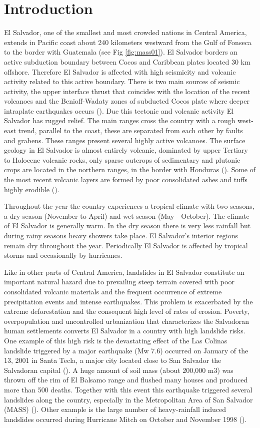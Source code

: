 \documentclass[11pt,twoside]{rmta2010esp}%
\begin{document}
\section{Introduction}
\label{sec:intr}
El Salvador, one of the smallest and most crowded nations in Central America, extends in Pacific coast about 240 kilometers westward from the Gulf of Fonseca to the border with Guatemala (see Fig \ref{fig:mass01}). El Salvador borders an active subduction boundary between Cocos and Caribbean plates located 30 km offshore. Therefore El Salvador is affected with high seismicity and volcanic activity related to this active boundary. There is two main sources of seismic activity, the upper interface thrust that coincides with the location of the recent volcanoes and the Benioff-Wadaty zones of subducted Cocos plate where deeper intraplate earthquakes occurs (\cite{dewey}). Due this tectonic and volcanic activity El Salvador has rugged relief. The main ranges cross the country with a rough west-east trend, parallel to the coast, these are separated from each other by faults and grabens. These ranges present several highly active volcanoes. The surface geology in El Salvador is almost entirely volcanic, dominated by upper Tertiary to Holocene volcanic rocks, only sparse outcrops of sedimentary and plutonic crops are located in the northern ranges, in the border with Honduras (\cite{weber}). Some of the most recent volcanic layers are formed by poor consolidated ashes and tuffs highly erodible (\cite{bommer}).

Throughout the year the country experiences a tropical climate with two seasons, a dry season (November to April) and wet season (May - October). The climate of El Salvador is generally warm. In the dry season there is very less rainfall but during rainy seasons heavy showers take place. El Salvador's interior regions remain dry throughout the year. Periodically El Salvador is affected by tropical storms and occasionally by hurricanes.

Like in other parts of Central America, landslides in El Salvador constitute an important natural hazard due to prevailing steep terrain covered with poor consolidated volcanic materials and the frequent occurrence of extreme precipitation events and intense earthquakes. This problem is exacerbated by the extreme deforestation and the consequent high level of rates of erosion. Poverty, overpopulation and uncontrolled urbanization that characterizes the Salvadoran human settlements converts El Salvador in a country with high landslide risks.
One example of this high risk is the devastating effect of the Las Colinas landslide triggered by a major earthquake (Mw 7.6) occurred on January of the 13, 2001  in Santa Tecla, a major city located close to San Salvador  the Salvadoran capital (\cite{evans}). A huge amount of soil mass (about 200,000 m3) was thrown off the rim of El Balsamo range and flushed many houses and produced more than 500 deaths. Together with this event this earthquake triggered several landslides along the country, especially in the Metropolitan Area of San Salvador (MASS) (\cite{jibson}). Other example is the large number of heavy-rainfall induced landslides occurred during Hurricane Mitch on October and November 1998 (\cite{crone}).   
\end{document}
